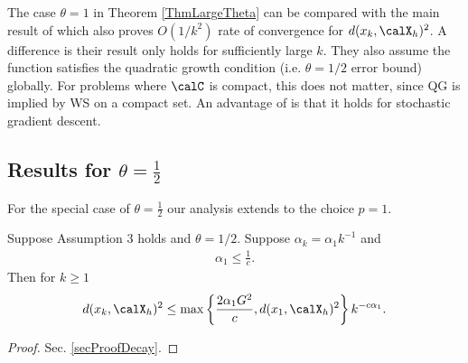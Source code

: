 
The case $\theta=1$ in Theorem \ref{ThmLargeTheta} can be compared with the main result of \cite{lim2011convergence} which also proves $O(1/k^2)$ rate of convergence for $d(x_k,\calX_h)^2$. A difference is their result only holds for sufficiently large $k$. They also assume the function satisfies the quadratic growth condition (i.e. $\theta=1/2$ error bound) globally. For problems where $\calC$ is compact, this does not matter, since QG is implied by WS on a compact set. An advantage of \cite{lim2011convergence} is that it holds for stochastic gradient descent.


\subsection{Results for $\theta=\frac{1}{2}$}
For the special case of $\theta=\frac{1}{2}$ our analysis extends to the choice $p=1$.
\begin{theorem}\label{thmD1}
Suppose Assumption 3 holds and $\theta=1/2$. 
Suppose $\alpha_k = \alpha_1 k^{-1}$ and
\begin{eqnarray*}
\alpha_1\leq\frac{1}{c}.
\end{eqnarray*}
Then for $k\geq 1$
\begin{eqnarray}\label{ThmD1Result}
d(x_k,\calX_h)^2
\leq \max\left\{\frac{2 \alpha_1 G^2}{c},d(x_1,\calX_h)^2\right\} k^{-c \alpha_1}.
\end{eqnarray}
\end{theorem}
\begin{proof}
Sec. \ref{secProofDecay}.
\end{proof}

